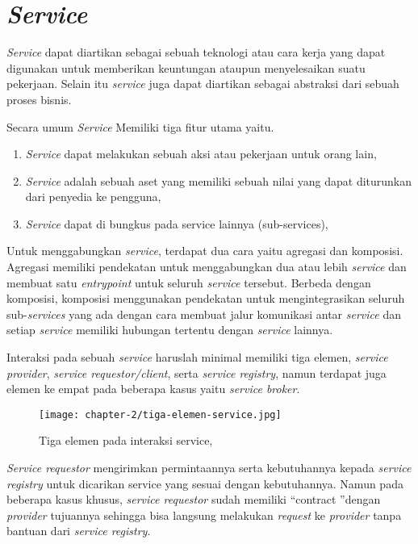 \section{\textit{Service}}

\textit{Service} dapat diartikan sebagai sebuah teknologi atau cara kerja yang dapat digunakan untuk memberikan keuntungan ataupun menyelesaikan suatu pekerjaan. Selain itu \textit{service} juga dapat diartikan sebagai abstraksi dari sebuah proses bisnis. \parencite{osullivan2002}

Secara umum \textit{Service} Memiliki tiga fitur utama yaitu.
\begin{enumerate}
  \item \textit{Service} dapat melakukan sebuah aksi atau pekerjaan untuk orang lain,
  \item \textit{Service} adalah sebuah aset yang memiliki sebuah nilai yang dapat diturunkan dari penyedia ke pengguna,
  \item \textit{Service} dapat di bungkus pada service lainnya (sub-services),
\end{enumerate}

Untuk menggabungkan \textit{service}, terdapat dua cara yaitu agregasi dan komposisi. Agregasi memiliki pendekatan untuk menggabungkan dua atau lebih \textit{service} dan membuat satu \textit{entrypoint} untuk seluruh \textit{service} tersebut. Berbeda dengan komposisi, komposisi menggunakan pendekatan untuk mengintegrasikan seluruh sub-\textit{services} yang ada dengan cara membuat jalur komunikasi antar \textit{service} dan setiap \textit{service} memiliki hubungan tertentu dengan \textit{service} lainnya.

Interaksi pada sebuah \textit{service} haruslah minimal memiliki tiga elemen, \textit{service provider}, \textit{service requestor/client}, serta \textit{\textit{service registry}}, namun terdapat juga elemen ke empat pada beberapa kasus yaitu \textit{service broker}.

\begin{figure}[ht]
  \centering
  \texttt{[image: chapter-2/tiga-elemen-service.jpg]}
  \caption{Tiga elemen pada interaksi service, \parencite{abugessaisa2023}}
  \label{fig:tiga-elemen-service}
\end{figure}

\textit{Service requestor} mengirimkan permintaannya serta kebutuhannya kepada \textit{service registry} untuk dicarikan service yang sesuai dengan kebutuhannya. Namun pada beberapa kasus khusus, \textit{service requestor}
sudah memiliki \textquotedblleft contract \textquotedblright dengan \textit{provider} tujuannya sehingga bisa langsung melakukan \textit{request} ke \textit{provider} tanpa bantuan dari \textit{service registry}.

